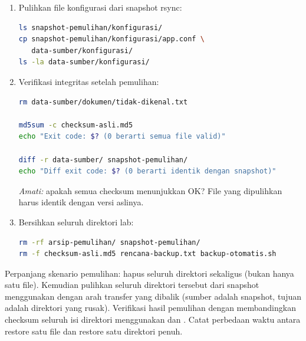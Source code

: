 \begin{enumerate}
\begin{lstlisting}[language=bash, caption={Restore dari arsip tar ke direktori sementara}]
mkdir -p /tmp/restore-lap14
tar -xzf arsip-pemulihan/full-backup.tar.gz \
    -C /tmp/restore-lap14 \
    data-sumber/dokumen/laporan.txt

ls /tmp/restore-lap14/data-sumber/dokumen/
cp /tmp/restore-lap14/data-sumber/dokumen/laporan.txt \
   data-sumber/dokumen/

rm -rf /tmp/restore-lap14
\end{lstlisting}

    \item Pulihkan file konfigurasi dari snapshot rsync:
\begin{lstlisting}[language=bash, caption={Restore dari snapshot rsync}]
ls snapshot-pemulihan/konfigurasi/
cp snapshot-pemulihan/konfigurasi/app.conf \
   data-sumber/konfigurasi/
ls -la data-sumber/konfigurasi/
\end{lstlisting}

    \item Verifikasi integritas setelah pemulihan:
\begin{lstlisting}[language=bash, caption={Verifikasi checksum setelah pemulihan}]
rm data-sumber/dokumen/tidak-dikenal.txt

md5sum -c checksum-asli.md5
echo "Exit code: $? (0 berarti semua file valid)"

diff -r data-sumber/ snapshot-pemulihan/
echo "Diff exit code: $? (0 berarti identik dengan snapshot)"
\end{lstlisting}
    \textit{Amati:} apakah semua checksum menunjukkan OK? File yang dipulihkan
    harus identik dengan versi aslinya.

    \item Bersihkan seluruh direktori lab:
\begin{lstlisting}[language=bash, caption={Membersihkan direktori praktikum}]
rm -rf arsip-pemulihan/ snapshot-pemulihan/
rm -f checksum-asli.md5 rencana-backup.txt backup-otomatis.sh
\end{lstlisting}
\end{enumerate}

\begin{challengebox}
Perpanjang skenario pemulihan: hapus seluruh direktori 
sekaligus (bukan hanya satu file). Kemudian pulihkan seluruh direktori tersebut
dari snapshot menggunakan  dengan arah transfer yang dibalik (sumber
adalah snapshot, tujuan adalah direktori yang rusak). Verifikasi hasil pemulihan
dengan membandingkan checksum seluruh isi direktori menggunakan \cmd{find} dan
\cmd{md5sum}. Catat perbedaan waktu antara restore satu file dan restore satu
direktori penuh.
\end{challengebox}

